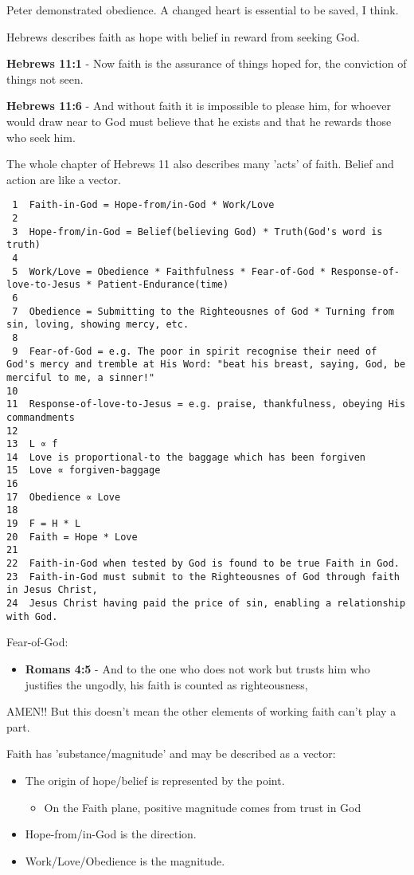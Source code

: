 \documentclass[11pt]{article}
\begin{document}
Peter demonstrated obedience. A changed heart is essential to be saved, I think.

Hebrews describes faith as hope with belief in reward from seeking God.

\textbf{Hebrews 11:1} - Now faith is the assurance of things hoped for, the conviction of things not seen.

\textbf{Hebrews 11:6} - And without faith it is impossible to please him, for whoever would draw near to God must believe that he exists and that he rewards those who seek him.

The whole chapter of Hebrews 11 also describes many 'acts' of faith. Belief and action are like a vector.

\begin{verbatim}
 1  Faith-in-God = Hope-from/in-God * Work/Love
 2  
 3  Hope-from/in-God = Belief(believing God) * Truth(God's word is truth)
 4  
 5  Work/Love = Obedience * Faithfulness * Fear-of-God * Response-of-love-to-Jesus * Patient-Endurance(time)
 6  
 7  Obedience = Submitting to the Righteousnes of God * Turning from sin, loving, showing mercy, etc.
 8  
 9  Fear-of-God = e.g. The poor in spirit recognise their need of God's mercy and tremble at His Word: "beat his breast, saying, God, be merciful to me, a sinner!"
10  
11  Response-of-love-to-Jesus = e.g. praise, thankfulness, obeying His commandments
12  
13  L ∝ f
14  Love is proportional-to the baggage which has been forgiven
15  Love ∝ forgiven-baggage
16  
17  Obedience ∝ Love
18  
19  F = H * L
20  Faith = Hope * Love
21  
22  Faith-in-God when tested by God is found to be true Faith in God.
23  Faith-in-God must submit to the Righteousnes of God through faith in Jesus Christ,
24  Jesus Christ having paid the price of sin, enabling a relationship with God.
\end{verbatim}

Fear-of-God:
\begin{itemize}
\item \textbf{Romans 4:5} - And to the one who does not work but trusts him who justifies the ungodly, his faith is counted as righteousness,
\end{itemize}

AMEN!! But this doesn't mean the other elements of working faith can't play a part.

Faith has 'substance/magnitude' and may be described as a vector:
\begin{itemize}
\item The origin of hope/belief is represented by the point.
\begin{itemize}
\item On the Faith plane, positive magnitude comes from trust in God
\end{itemize}
\item Hope-from/in-God is the direction.
\item Work/Love/Obedience is the magnitude.
\end{itemize}
\end{document}
